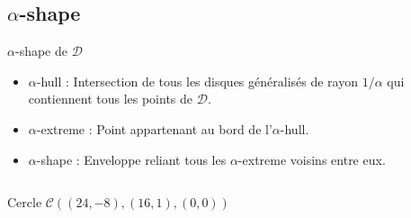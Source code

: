 \documentclass{beamer}
\begin{document}
\subsection{$\alpha$-shape}
\begin{frame}
  \begin{block}{$\alpha$-shape de $\mathcal{D}$}
    \begin{itemize}
      \item $\alpha$-hull : Intersection de tous les disques généralisés de rayon $1/\alpha$ qui contiennent tous les points de $\mathcal{D}$.
      \item $\alpha$-extreme : Point appartenant au bord de l'$\alpha$-hull.
      \item $\alpha$-shape : Enveloppe reliant tous les $\alpha$-extreme voisins entre eux.
    \end{itemize}
  \end{block}
\begin{columns}[t]
  \begin{column}{4cm}
    \begin{exampleblock}{Cercle}
      $\mathcal{C} \left( (24,-8), (16,1), (0,0) \right)$\\
       

\end{exampleblock}
\end{column}
\end{columns}
\end{frame}
\end{document}
